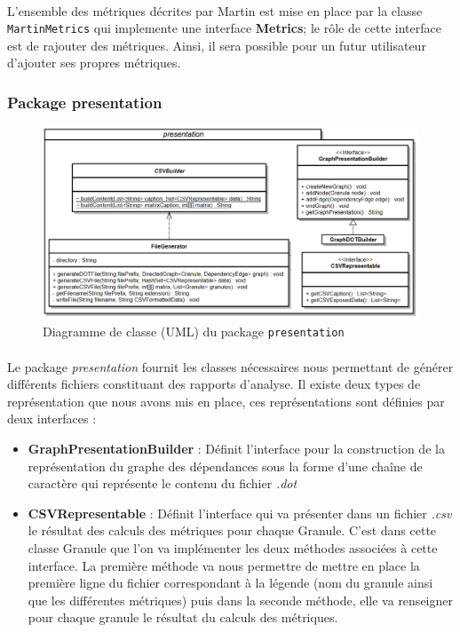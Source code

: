 \documentclass{scrartcl}
\begin{document}
    \paragraph{}L'ensemble des métriques décrites par Martin\cite{Martin:1994} est mise en place par la classe \texttt{MartinMetrics} qui implemente une interface \textbf{Metrics}; le rôle de cette interface est de rajouter des métriques. Ainsi, il sera possible pour un futur utilisateur d'ajouter ses propres métriques.

\subsubsection{Package presentation}
    \begin{figure}[h!]
        \centering
        \includegraphics[width=\textwidth]{img/uml/presentation.png}
        \caption{Diagramme de classe (UML) du package \texttt{presentation}}
    \end{figure}
    \paragraph{}Le package \emph{presentation} fournit les classes nécessaires nous permettant de générer différents fichiers constituant des rapports d'analyse. Il existe deux types de représentation que nous avons mis en place, ces représentations sont définies par deux interfaces :
    \begin{itemize}
        \item \textbf{GraphPresentationBuilder} : Définit l'interface pour la construction de la représentation du graphe des dépendances sous la forme d'une chaîne de caractère qui représente le contenu du fichier \emph{.dot}
        \item \textbf{CSVRepresentable} : Définit l'interface qui va présenter dans un fichier \emph{.csv} le résultat des calculs des métriques pour chaque Granule. C'est dans cette classe Granule que l'on va implémenter les deux méthodes associées à cette interface. La première méthode va nous permettre de mettre en place la première ligne du fichier correspondant à la légende (nom du granule ainsi que les différentes métriques) puis dans la seconde méthode, elle va renseigner pour chaque granule le résultat du calculs des métriques. 
    \end{itemize}
    
\end{document}
